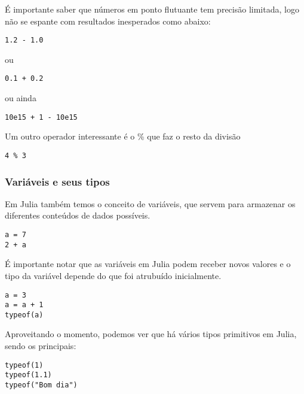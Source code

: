 \documentclass[a4paper]{article}
\begin{document}
É importante saber que números em ponto flutuante tem precisão limitada, logo não se espante com resultados inesperados como abaixo:

\lstset{language=ein-julia,label=org6110caf,caption= ,captionpos=b,numbers=none}
\begin{lstlisting}
1.2 - 1.0
\end{lstlisting}

ou
\lstset{language=ein-julia,label=org676c1ac,caption= ,captionpos=b,numbers=none}
\begin{lstlisting}
0.1 + 0.2
\end{lstlisting}

ou ainda

\lstset{language=ein-julia,label=org39c0b73,caption= ,captionpos=b,numbers=none}
\begin{lstlisting}
10e15 + 1 - 10e15
\end{lstlisting}

Um outro operador interessante é o \% que faz o resto da divisão

\lstset{language=ein-julia,label=orgdf6ac29,caption= ,captionpos=b,numbers=none}
\begin{lstlisting}
4 % 3
\end{lstlisting}

\subsubsection{Variáveis e seus tipos}
\label{sec:org7236f5d}
Em Julia também temos o conceito de variáveis, que servem para armazenar os
diferentes conteúdos de dados possíveis.

\lstset{language=ein-julia,label=org27b9928,caption= ,captionpos=b,numbers=none}
\begin{lstlisting}
a = 7
2 + a
\end{lstlisting}

É importante notar que as variáveis em Julia podem receber novos valores e o tipo
da variável depende do que foi atrubuído inicialmente.

\lstset{language=ein-julia,label=orgf4ba7b6,caption= ,captionpos=b,numbers=none}
\begin{lstlisting}
a = 3
a = a + 1
typeof(a)
\end{lstlisting}

Aproveitando o momento, podemos ver que há vários tipos primitivos em Julia, sendo os
principais:

\lstset{language=ein-julia,label=org0d4629a,caption= ,captionpos=b,numbers=none}
\begin{lstlisting}
typeof(1)
typeof(1.1)
typeof("Bom dia")
\end{lstlisting}
\end{document}
